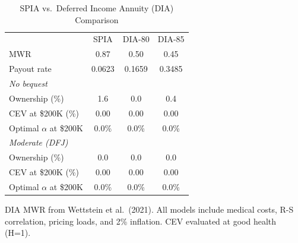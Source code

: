 \begin{table}[htbp]
\centering
\caption{SPIA vs.\ Deferred Income Annuity (DIA) Comparison}
\label{tab:dia}
\begin{tabular}{lccc}
\toprule
 & SPIA & DIA-80 & DIA-85 \\
MWR & 0.87 & 0.50 & 0.45 \\
Payout rate & 0.0623 & 0.1659 & 0.3485 \\
\midrule
\multicolumn{4}{l}{\textit{No bequest}} \\
\quad Ownership (\%) & 1.6 & 0.0 & 0.4 \\
\quad CEV at \$200K (\%) & 0.00 & 0.00 & 0.00 \\
\quad Optimal $\alpha$ at \$200K & 0.0\% & 0.0\% & 0.0\% \\
\midrule
\multicolumn{4}{l}{\textit{Moderate (DFJ)}} \\
\quad Ownership (\%) & 0.0 & 0.0 & 0.0 \\
\quad CEV at \$200K (\%) & 0.00 & 0.00 & 0.00 \\
\quad Optimal $\alpha$ at \$200K & 0.0\% & 0.0\% & 0.0\% \\
\bottomrule
\end{tabular}
\begin{tablenotes}
\small
\item DIA MWR from Wettstein et al.\ (2021). All models include
medical costs, R-S correlation, pricing loads, and 2\% inflation.
CEV evaluated at good health (H=1).
\end{tablenotes}
\end{table}
